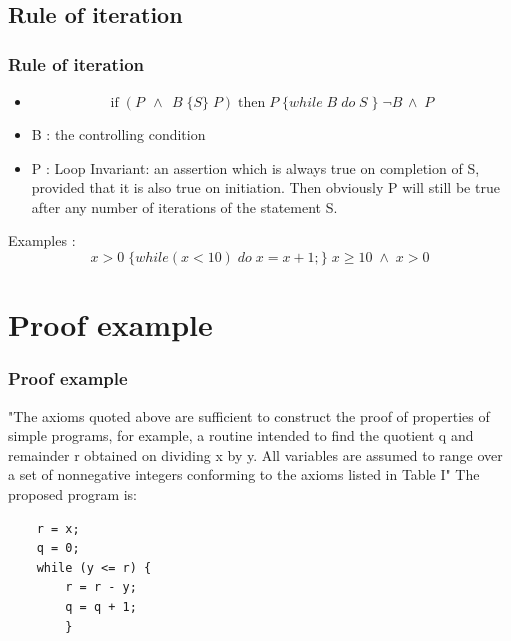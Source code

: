 \documentclass{beamer}
\begin{document}
\subsection{Rule of iteration}
\begin{frame}
        \frametitle{Rule of iteration}
	\begin{itemize}
		\item $$\textrm{if} \; (P \; \, \land \; \, B \; \{S\} \; P) \;\textrm{then} \; P \; \{while \; B \; do \; S \; \} \; \neg B \, \land \; P $$
		\item B : the controlling condition
		\item P : Loop Invariant: an assertion which is always true on completion of S, provided that it is also true on initiation. Then obviously P will still be true after any number of iterations of the statement S.
	\end{itemize}
	\pause
	Examples :
	$$ x > 0 \; \{ while(x<10) \; do \; x = x + 1;\} \; x \geq 10 \; \land \; x > 0 $$
\end{frame}

\section{Proof example}
	\begin{frame}[fragile] 
 \frametitle{Proof example}
	"The axioms quoted above are sufficient to construct the proof of properties of simple
programs, for example, a routine intended to find the quotient q and remainder r obtained on
dividing x by y. All variables are assumed to range over a set of nonnegative integers
conforming to the axioms listed in Table I"
The proposed program is: 
\center
\begin{lstlisting}
    r = x;
    q = 0;
    while (y <= r) {
	    r = r - y;
	    q = q + 1;
	    }
\end{lstlisting}

\end{frame}
\end{document}
